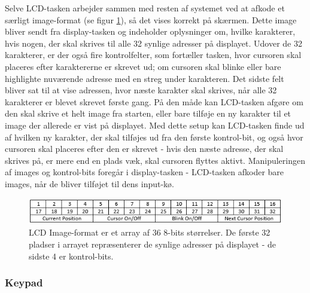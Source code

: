 Selve LCD-tasken arbejder sammen med resten af systemet ved at afkode et særligt image-format (se figur \ref{fig:LCD_array}), så det vises korrekt på skærmen. Dette image bliver sendt fra display-tasken og indeholder oplysninger om, hvilke karakterer, hvis nogen, der skal skrives til alle 32 synlige adresser på displayet. Udover de 32 karakterer, er der også fire kontrolfelter, som fortæller tasken, hvor cursoren skal placeres efter karaktererne er skrevet ud; om cursoren skal blinke eller bare highlighte nuværende adresse med en streg under karakteren. Det sidste felt bliver sat til at vise adressen, hvor næste karakter skal skrives, når alle 32 karakterer er blevet skrevet første gang. På den måde kan LCD-tasken afgøre om den skal skrive et helt image fra starten, eller bare tilføje en ny karakter til et image der allerede er vist på displayet. Med dette setup kan LCD-tasken finde ud af hvilken ny karakter, der skal tilføjes ud fra den første kontrol-bit, og også hvor cursoren skal placeres efter den er skrevet - hvis den næste adresse, der skal skrives på, er mere end en plads væk, skal cursoren flyttes aktivt. Manipuleringen af images og kontrol-bits foregår i display-tasken - LCD-tasken afkoder bare images, når de bliver tilføjet til dens input-kø.


\begin{figure}[ht]
			\begin{center}
			\includegraphics[scale=0.9]{Billeder/LCD_Array.PNG}
			\end{center}
			\caption{LCD Image-format er et array af 36 8-bits størrelser. De første 32 pladser i arrayet repræsenterer de synlige adresser på displayet - de sidste 4 er kontrol-bits.}
			\label{fig:LCD_array}
\end{figure}

\subsubsection{Keypad}

